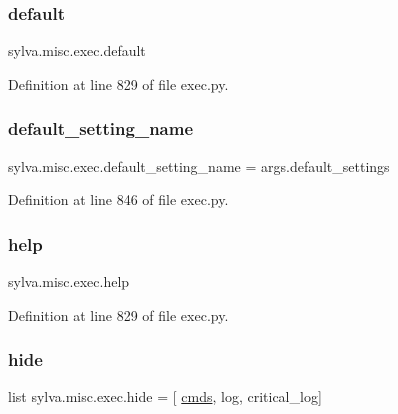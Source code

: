 \subsubsection{\texorpdfstring{default}{default}}
{\footnotesize\ttfamily sylva.\+misc.\+exec.\+default}



Definition at line 829 of file exec.\+py.

\mbox{\label{namespacesylva_1_1misc_1_1exec_a891749b8d985a498eae349a322db6717}} 
\subsubsection{\texorpdfstring{default\+\_\+setting\+\_\+name}{default\_setting\_name}}
{\footnotesize\ttfamily sylva.\+misc.\+exec.\+default\+\_\+setting\+\_\+name = args.\+default\+\_\+settings}



Definition at line 846 of file exec.\+py.

\mbox{\label{namespacesylva_1_1misc_1_1exec_aeda0fdf1916b33ff3f5731b2bd0e8d4b}} 
\subsubsection{\texorpdfstring{help}{help}}
{\footnotesize\ttfamily sylva.\+misc.\+exec.\+help}



Definition at line 829 of file exec.\+py.

\mbox{\label{namespacesylva_1_1misc_1_1exec_a3ea80c1ba7b91d1eee2ec5ab2e47082d}} 
\subsubsection{\texorpdfstring{hide}{hide}}
{\footnotesize\ttfamily list sylva.\+misc.\+exec.\+hide = \mbox{[} \textquotesingle{}\hyperlink{namespacesylva_1_1misc_1_1exec_a4c36666d7d4852a6684f769a8bc916f4}{cmds}\textquotesingle{}, \textquotesingle{}log\textquotesingle{}, \textquotesingle{}critical\+\_\+log\textquotesingle{}\mbox{]}}



